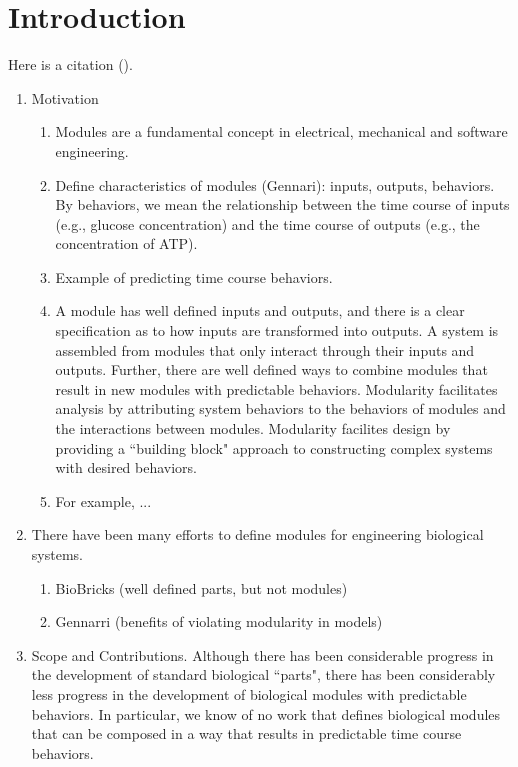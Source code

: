 \documentclass[unnumsec,webpdf,contemporary,large]{oup-authoring-template}%
\theoremstyle{thmstyleone}%
\theoremstyle{thmstyletwo}%
\theoremstyle{thmstylethree}%
\begin{document}
\maketitle


\section{Introduction}
Here is a citation (\cite{al2002handgrip}).
\begin{enumerate}

\item
Motivation
\begin{enumerate}
\item
Modules are a fundamental concept in electrical, mechanical and software engineering.
\item
Define characteristics of modules (Gennari): inputs, outputs, behaviors.
By behaviors, we mean the relationship between the time course
of inputs (e.g., glucose concentration) and the
time course of outputs (e.g., the
concentration of ATP).
\item
Example of predicting time course behaviors.
\item
A module has well defined inputs and outputs, and there is a clear specification as to how inputs are transformed into outputs. A system is assembled from modules that only interact through their inputs and outputs. Further, there are well defined ways to combine modules that result in new modules with predictable behaviors.
Modularity facilitates analysis by
attributing system behaviors to the behaviors of modules
and the interactions between modules.
Modularity facilites design by providing a ``building block" approach
to constructing complex systems with desired behaviors.
\item
For example, ...
\end{enumerate}
\item
There have been many efforts to define modules for engineering biological systems.
\begin{enumerate}
\item BioBricks (well defined parts, but not modules)
\item Gennarri (benefits of violating modularity in models)
\end{enumerate}
\item Scope and Contributions.
Although there has been considerable progress in the development of standard
biological ``parts", there has been considerably less progress in the
development of biological modules with predictable behaviors.
In particular, we know of no work that defines biological modules
that can be composed in a way that results in predictable time course behaviors.


\end{enumerate}
\end{document}
